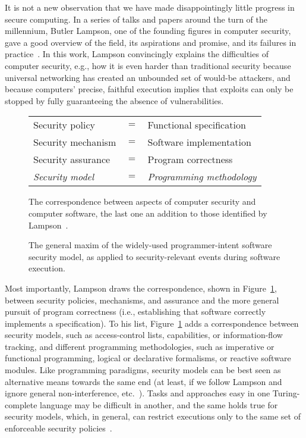 \documentclass{IEEEtran}
\begin{document}
It is not a new observation that we have made disappointingly little progress in secure computing.  
In a series of talks and papers around the turn of the millennium, Butler Lampson, one of the founding figures in computer security, gave a good overview of the field, its aspirations and promise, and its failures in practice~\cite{LampsonRealWorld}.
In this work, 
Lampson convincingly explains the difficulties of computer security, e.g., how it is even harder than traditional security because universal networking has created an unbounded set of would-be attackers, and because computers’ precise, faithful execution implies that exploits can only be stopped by fully guaranteeing the absence of vulnerabilities.


\begin{figure}[t]
\centering
\begin{tabular}{lcl}
Security policy & $=$ & Functional specification \\
Security mechanism & $=$ & Software implementation \\
Security assurance & $=$ & Program correctness \\
\emph{Security model} & $=$ & \emph{Programming methodology}
\end{tabular}
\caption{The correspondence between aspects of computer security and computer software, the last one an addition to those identified by Lampson~\cite{LampsonRealWorld}.}\label{fig:terminology}
\end{figure}



\begin{figure*}[t]
\centering
{}
\caption{The general maxim of the widely-used programmer-intent software security model, as applied to security-relevant events during software execution.}\label{fig:piss}
\end{figure*}


Most importantly, Lampson draws the correspondence, shown in Figure~\ref{fig:terminology}, between security policies, mechanisms, and assurance and the more general pursuit of program correctness (i.e., establishing that software correctly implements a specification).
To his list, Figure~\ref{fig:terminology} adds a correspondence between security models, such as access-control lists, capabilities, or information-flow tracking, and different programming methodologies, such as imperative or functional programming, logical or declarative formalisms, or reactive software modules.
Like programming paradigms, 
security models can be best seen as alternative means towards the same end
(at least, if we follow Lampson and ignore general non-interference, etc.~\cite{hyperprop}).
Tasks and approaches easy in one Turing-complete language
may be difficult in another,
and the same holds true for security models,
which, in general,
can restrict executions only to the same set
of enforceable security policies~\cite{Enforceable}.
\end{document}
